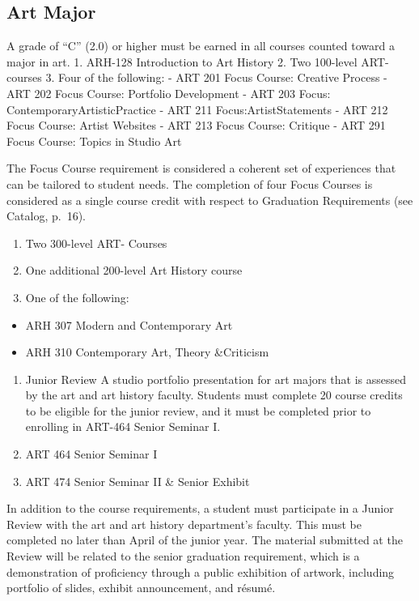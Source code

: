 \documentclass[
  letterpaper,
]{scrbook}
\providecommand{\tightlist}{%
  \setlength{\itemsep}{0pt}\setlength{\parskip}{0pt}}
\begin{document}
\subsection{Art Major}\label{art-major}

A grade of ``C'' (2.0) or higher must be earned in all courses counted
toward a major in art. 1. ARH-128 Introduction to Art History 2. Two
100-level ART- courses 3. Four of the following: - ART 201 Focus Course:
Creative Process - ART 202 Focus Course: Portfolio Development - ART 203
Focus: ContemporaryArtisticPractice - ART 211 Focus:ArtistStatements -
ART 212 Focus Course: Artist Websites - ART 213 Focus Course: Critique -
ART 291 Focus Course: Topics in Studio Art

The Focus Course requirement is considered a coherent set of experiences
that can be tailored to student needs. The completion of four Focus
Courses is considered as a single course credit with respect to
Graduation Requirements (see Catalog, p.~16).

\begin{enumerate}
\def\labelenumi{\arabic{enumi}.}
\setcounter{enumi}{3}
\tightlist
\item
  Two 300-level ART- Courses
\item
  One additional 200-level Art History course
\item
  One of the following:
\end{enumerate}

\begin{itemize}
\tightlist
\item
  ARH 307 Modern and Contemporary Art
\item
  ARH 310 Contemporary Art, Theory \&Criticism
\end{itemize}

\begin{enumerate}
\def\labelenumi{\arabic{enumi}.}
\setcounter{enumi}{6}
\item
  Junior Review A studio portfolio presentation for art majors that is
  assessed by the art and art history faculty. Students must complete 20
  course credits to be eligible for the junior review, and it must be
  completed prior to enrolling in ART-464 Senior Seminar I.
\item
  ART 464 Senior Seminar I
\item
  ART 474 Senior Seminar II \& Senior Exhibit
\end{enumerate}

In addition to the course requirements, a student must participate in a
Junior Review with the art and art history department's faculty. This
must be completed no later than April of the junior year. The material
submitted at the Review will be related to the senior graduation
requirement, which is a demonstration of proficiency through a public
exhibition of artwork, including portfolio of slides, exhibit
announcement, and résumé.
\end{document}
